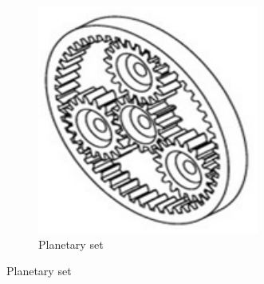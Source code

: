 \documentclass[10pt,letterpaper]{book}
\begin{document}
\begin{figure}[H]
\begin{subfigure}[b]{.32\linewidth}
		\includegraphics[width=0.8\textwidth]{imgs/gear_planetary.png}
		\caption{Planetary set}
	\end{subfigure}
	

\end{figure}
\end{document}

